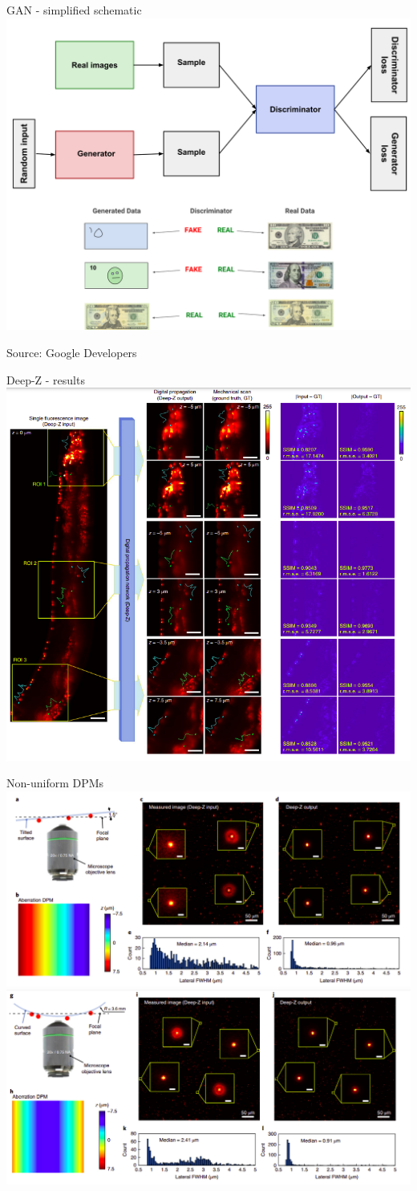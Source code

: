 \documentclass[9pt, aspectratio=169]{beamer}
\begin{document}
\begin{frame}
    {GAN - simplified schematic}
    \centering
    \includegraphics[width=.65\textwidth]{GAN.png}

    \footnotesize
    \raggedright
    Source: Google Developers
\end{frame}

\begin{frame}
    {Deep-Z - results}
    \centering
    \includegraphics[width=.6\textwidth]{deepz_results.png}
\end{frame}

\begin{frame}
    {Non-uniform DPMs}
    {
        \centering
        \includegraphics[width=.8\textwidth]{tilted_DPM.png}
    }
    {
        \centering
        \includegraphics[width=.8\textwidth]{curved_DPM.png}
    }
\end{frame}
\end{document}
